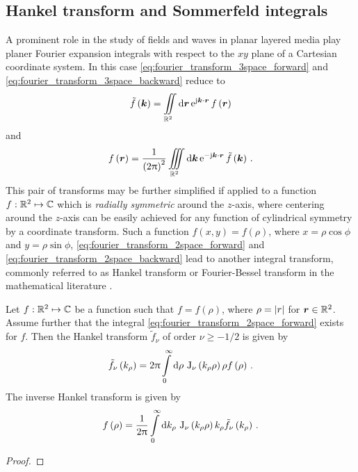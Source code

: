 \subsection{Hankel transform and Sommerfeld integrals}

A prominent role in the study of fields and waves in planar layered media play
planer Fourier expansion integrals with respect to the $xy$ plane of a
Cartesian coordinate system.
In this case \eqref{eq:fourier_transform_3space_forward} and
\eqref{eq:fourier_transform_3space_backward} reduce to
\begin{equation}\label{eq:fourier_transform_2space_forward}
	\tilde{f} \left( \pvec{k} \right) = 
	\iint\limits_{\R^2} \dd \pvec{r} \,
	\exp{\im \pvec{k} \cdot \pvec{r}}
	f \left( \pvec{r} \right)
\end{equation}
and
\begin{equation}\label{eq:fourier_transform_2space_backward}
	f \left( \pvec{r} \right) = 
	\frac{1}{\left( 2\pi \right)^2}
	\iiint\limits_{\R^2} \dd \pvec{k} \,
	\exp{-\im \pvec{k} \cdot \pvec{r}}
	\tilde{f} \left( \pvec{k} \right) \, .
\end{equation}
This pair of transforms may be further simplified if applied to a function
$f: \mathbb{R}^2 \mapsto \mathbb{C}$ which is \emph{radially symmetric} around the $z$-axis,
where centering around the $z$-axis can be easily achieved for any function
of cylindrical symmetry by a coordinate transform.
Such a function $f \left(x, y\right) = f \left(\rho\right)$, where
$x = \rho \cos \phi$ and $y = \rho \sin \phi$, 
\eqref{eq:fourier_transform_2space_forward}
and \eqref{eq:fourier_transform_2space_backward} lead to another integral
transform, commonly referred to as Hankel transform or Fourier-Bessel
transform in the mathematical literature \cite{Davies2002}.

\begin{corollary}\label{coll:hankel_transform}
	Let $f: \mathbb{R}^2 \mapsto \mathbb{C}$ be a function such that $f = f\left(\rho\right)$,
	where $\rho = \left\vert r\right\vert$ for $\pvec{r} \in \R^2$.
	Assume further that the integral \eqref{eq:fourier_transform_2space_forward}
	exists for $f$.
	Then the Hankel transform $\tilde{f}_\nu$ of order $\nu \geq -1/2$
	is given by
	\begin{equation}\label{eq:hankel_transform_forward}
		\tilde{f}_\nu\left(k_\rho\right) =
		2\uppi
		\int\limits_{0}^{\infty} \mathrm{d} \rho \,
		\operatorname{J}_{\nu}\left(k_\rho \rho\right) \rho
		f\left(\rho\right) \, .
	\end{equation}
	The inverse Hankel transform is given by
	\begin{equation}\label{eq:hankel_transform_inverse}
		f\left(\rho\right) =
		\frac{1}{2\uppi}
		\int\limits_{0}^{\infty} \mathrm{d} k_\rho \,
		\operatorname{J}_{\nu}\left(k_\rho \rho\right) k_\rho
		\tilde{f}_\nu\left(k_\rho\right) \, .
	\end{equation}
\end{corollary}
\begin{proof}
	
\end{proof}

